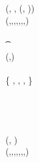 \begin{figure}
\begin{center}
{\begin{varwidth}{\textwidth}
{            \varSigContext \opFunResult \procSetupCtx{\varSigContext}{\funGen{\varSecKeyAlice}}{\funGen{\varNonceAlice}} \\
            \varPreTx \opFunResult {} \\
            \pcreturn (\varPreTx, \funStar{\varSpendableCoinAlice}, (\varSecKeyAlice, \varNonceAlice))
            } \\
            \procedure[linenumbering]{$\procRecvCoins{\varPreTx}{\varFundValue}$} {
            (\varMsg,\varInputs,\varOutputs,\varProofs,\varSigContext,\varCommits,\cnstEmptySet,\varTime) \opFunResult \varPreTx \\
            \pcif \procVerfProof{\varProofs[0]}{\varOutputs[0]}  \\
            \t \pcreturn \cnstFalsum \\
            (\funStar{\varBlindingFactorBob},\varNonceBob) \sample \cnstIntegersPrimeWithoutZero{\varPrime} \\
            \funStar{\varSpendableCoinBob} \opFunResult \procCreateCoin{\varFundValue}{\funStar{\varBlindingFactorBob}} \\
            \{ \varCoinOutBob, \funStar{\varBlindingFactorBob}, \varValueBob, \varProofBob \} \opFunResult \funStar{\varSpendableCoinBob} \\
            \varSecKeyBob \opAssign \funStar{\varBlindingFactorBob} \\
            \varSigContext \opFunResult \procSetupCtx{\varSigContext}{\funGen{\varSecKeyBob}}{\funGen{\varNonceBob}} \\
            \varSigBob \opFunResult \procSignPrt{\varMsg}{\varSecKeyBob}{\varNonceBob}{\varSigContext} \\
            \varPreTx \opFunResult \procCreatePreTx{\varMsg}{\varInputs}{\varOutputs \opConc \varCoinOutBob}{\varProofs \opConc \varProofBob}{\varSigContext}{\varCommits \opConc \funGen{\varSecKeyBob}}{\varSigBob}{\varTime} \\
            \pcreturn (\varPreTx, \funStar{\varSpendableCoinBob})
            } \\
            \procedure[linenumbering]{$\procFinTx{\varPreTx}{\varSecKeyAlice}{\varNonceAlice}$} {
            (\varMsg,\varInputs,\varOutputs,\varProofs,\varSigContext,\varCommits,\varSigBob,\varTime) \opFunResult \varPreTx \\
}
\end{varwidth}}
\end{center}
\end{figure}
